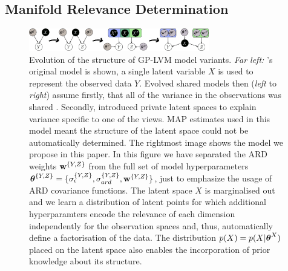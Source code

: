 \subsection{Manifold Relevance Determination}
%
\begin{figure}[t]
  \begin{center}
    \includegraphics[width=0.7\textwidth]{../diagrams/graphicalmodel.pdf}
  \end{center}
  \caption{ %
    Evolution of the structure of GP-LVM model variants. \emph{Far left:}
    \citet{Lawrence:2005vk}'s original model is shown, a single latent
    variable $X$ is used to represent the observed data $Y$. Evolved
    shared models then (\emph{left} to \emph{right}) assume firstly,
    that all of the variance in the observations was shared \cite{Shon:2006wr}. Secondly, \citet{Ek:2008up} introduced private latent spaces to explain variance specific to one of the views. MAP estimates used in this model meant the structure of the latent space could not be automatically determined. The rightmost image shows the model we propose in this
    paper.
%
%
     In this figure we have separated the ARD weights $\mathbf{w}^{\{Y,Z\}}$ from the full set of model hyperparameters
      $\boldsymbol \theta^{\{Y,Z\}} = \{ \sigma_{\epsilon}^{\{Y,Z\}}, \sigma_{ard}^{\{Y,Z\}}, \mathbf{w}^{\{Y,Z\}} \}$, 
      just to emphasize the usage of ARD covariance functions.
     The latent space $X$ is marginalised out and we learn a
    distribution of latent points for which additional hyperparamters
    encode the relevance of each dimension independently for the
    observation spaces and, thus, automatically define a factorisation
    of the data. The distribution $p(X) = p(X|\boldsymbol \theta^X)$ placed on the latent space also enables the incorporation of prior knowledge about its structure.
  }
 \label{fig:grModel}
\end{figure}
